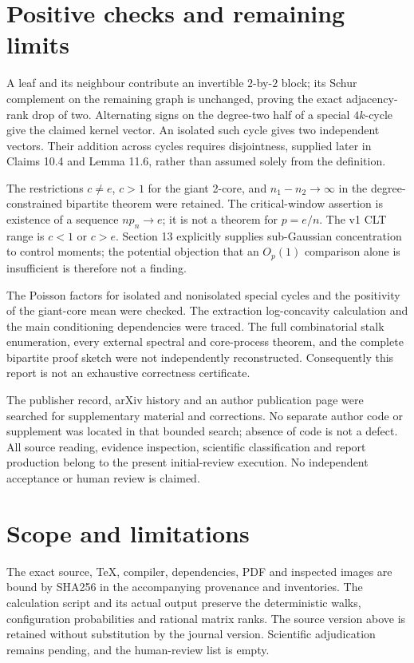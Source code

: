 \documentclass[10pt]{article}
\begin{document}
\section*{Positive checks and remaining limits}
A leaf and its neighbour contribute an invertible \(2\)-by-\(2\) block; its Schur complement on the remaining graph is unchanged, proving the exact adjacency-rank drop of two. Alternating signs on the degree-two half of a special \(4k\)-cycle give the claimed kernel vector. An isolated such cycle gives two independent vectors. Their addition across cycles requires disjointness, supplied later in Claims 10.4 and Lemma 11.6, rather than assumed solely from the definition.\par
The restrictions \(c\ne e\), \(c>1\) for the giant 2-core, and \(n_1-n_2\to\infty\) in the degree-constrained bipartite theorem were retained. The critical-window assertion is existence of a sequence \(np_n\to e\); it is not a theorem for \(p=e/n\). The v1 CLT range is \(c<1\) or \(c>e\). Section 13 explicitly supplies sub-Gaussian concentration to control moments; the potential objection that an \(O_p(1)\) comparison alone is insufficient is therefore not a finding.\par
The Poisson factors for isolated and nonisolated special cycles and the positivity of the giant-core mean were checked. The extraction log-concavity calculation and the main conditioning dependencies were traced. The full combinatorial stalk enumeration, every external spectral and core-process theorem, and the complete bipartite proof sketch were not independently reconstructed. Consequently this report is not an exhaustive correctness certificate.\par
The publisher record, arXiv history and an author publication page were searched for supplementary material and corrections. No separate author code or supplement was located in that bounded search; absence of code is not a defect. All source reading, evidence inspection, scientific classification and report production belong to the present initial-review execution. No independent acceptance or human review is claimed.\par
\section*{Scope and limitations}
The exact source, TeX, compiler, dependencies, PDF and inspected images are bound by SHA256 in the accompanying provenance and inventories. The calculation script and its actual output preserve the deterministic walks, configuration probabilities and rational matrix ranks. The source version above is retained without substitution by the journal version. Scientific adjudication remains pending, and the human-review list is empty.\par
\end{document}

